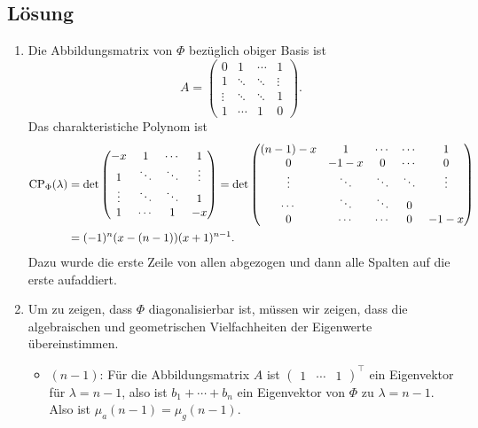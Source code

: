 \subsection{Lösung}
\begin{enumerate}
	\item Die Abbildungsmatrix von \( \Phi \) bezüglich obiger Basis ist
	\begin{equation*}
	 	A = \begin{pmatrix}
	 		0 & 1 & \cdots & 1 \\
	 		1 & \ddots & \ddots & \vdots \\
	 		\vdots & \ddots & \ddots & 1 \\
	 		1 & \cdots & 1 & 0
	 	\end{pmatrix}\text{.}
	 \end{equation*} 
	 Das charakteristiche Polynom ist
	 \begin{align*}
	 	\text{CP}_\Phi(\lambda) &= \det \begin{pmatrix}
	 		-x & 1 & \cdots & 1 \\
	 		1 & \ddots & \ddots & \vdots \\
	 		\vdots & \ddots & \ddots & 1 \\
	 		1 & \cdots & 1 & -x
	 	\end{pmatrix} = \det \begin{pmatrix}
	 		(n-1)-x & 1 & \cdots & \cdots & 1 \\
	 		0 & -1-x & 0 & \cdots & 0 \\
	 		\vdots & \ddots & \ddots & \ddots & \vdots \\
	 		\cdots & \ddots & \ddots & 0 \\
	 		0 & \cdots & \cdots & 0 & -1-x
	 	\end{pmatrix} \\
	 	 &= (-1)^n(x-(n-1))(x+1)^{n-1}\text{.}
	 \end{align*}
	 Dazu wurde die erste Zeile von allen abgezogen und dann alle Spalten auf die erste aufaddiert.

	 \item Um zu zeigen, dass \( \Phi \) diagonalisierbar ist, müssen wir zeigen, dass die algebraischen und geometrischen Vielfachheiten der Eigenwerte übereinstimmen.
	 \begin{itemize}
	 	\item \( (n-1) \): Für die Abbildungsmatrix \( A \) ist \( \begin{pmatrix}
	 		1 & \cdots & 1
	 	\end{pmatrix}^\top \) ein Eigenvektor für \( \lambda = n-1 \), also ist \( b_1 + \cdots + b_n \) ein Eigenvektor von \( \Phi \) zu \( \lambda = n-1 \). Also ist \( \mu_a(n-1) = \mu_g(n-1) \).


\end{itemize}
\end{enumerate}
